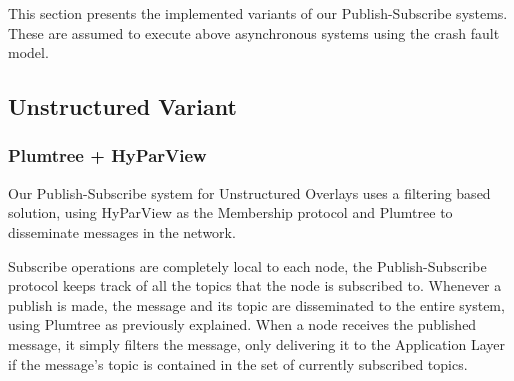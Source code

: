 \documentclass[sigconf]{acmart}
\begin{document}
This section presents the implemented variants of our Publish-Subscribe systems. These are assumed to execute above asynchronous systems using the crash fault model.

\subsection{Unstructured Variant}

\subsubsection{Plumtree + HyParView} %

Our Publish-Subscribe system for Unstructured Overlays uses a filtering based solution, using HyParView as the Membership protocol and Plumtree to disseminate messages in the network.

Subscribe operations are completely local to each node, the Publish-Subscribe protocol keeps track of all the topics that the node is subscribed to.
Whenever a publish is made, the message and its topic are disseminated to the entire system, using Plumtree as previously explained. When a node receives the published message, it simply filters the message, only delivering it to the Application Layer if the message's topic is contained in the set of currently subscribed topics.
\end{document}
